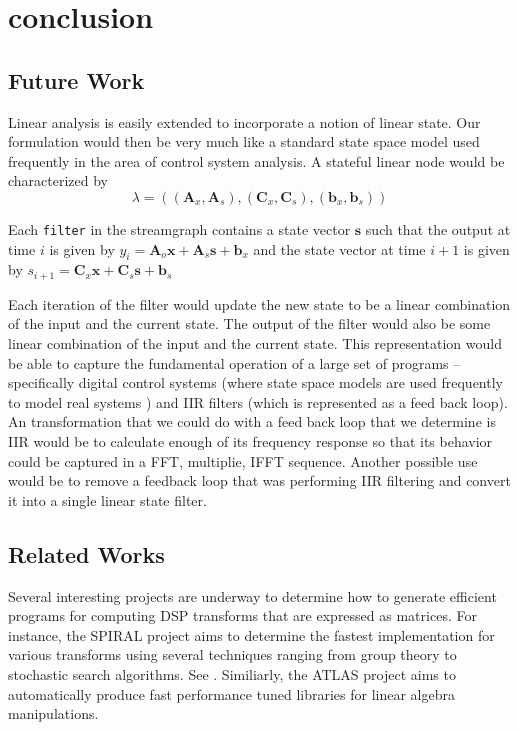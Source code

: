 \section{conclusion}




\subsection{Future Work}
Linear analysis is easily extended to incorporate a notion of linear state.
Our formulation would then be very much like a standard state space model used 
frequently in the area of control system analysis. A stateful linear node would
be characterized by
\begin{equation} \nonumber
\lambda=(({\mathbf A}_x, {\mathbf A}_s), ({\mathbf C}_x, {\mathbf C}_s), 
({\mathbf b}_x, {\mathbf b}_s))
\end{equation}

Each {\tt filter} in the streamgraph contains a state vector ${\mathbf s}$
such that the output at time $i$ is given by 
$y_i={\mathbf A}_o{\mathbf x} + {\mathbf A}_s{\mathbf s} + {\mathbf b}_x$
and the state vector at time $i+1$ is given by
$s_{i+1}={\mathbf C}_x{\mathbf x} + {\mathbf C}_s{\mathbf s} + {\mathbf b}_s$

Each iteration of the filter would update the new state to be
a linear combination of the input and the current state. The output of the 
filter would also be some linear combination of the input and the current state.
This representation would be able to capture the fundamental operation of
a large set of programs -- specifically digital control systems (where state
space models are used frequently to model real systems ) and IIR filters (which
is represented as a feed back loop). An transformation that we could do with 
a feed back loop that we determine is IIR would be to calculate enough of its
frequency response so that its behavior could be captured in a FFT, multiplie,
IFFT sequence. Another possible use would be to remove a feedback loop that was
performing IIR filtering and convert it into a single linear state filter.  




\subsection{Related Works}
Several interesting projects are underway to determine how to generate efficient programs
for computing DSP transforms that are expressed as matrices. For instance, the SPIRAL
project\cite{spiral} aims to determine the fastest implementation for various transforms
using several techniques ranging from group theory to stochastic search algorithms. See
 \cite{xiong-thesis,xiong01spl,johnson01searching,egner01automatic}.
Similiarly, the ATLAS project \cite{whaley01automated} aims to automatically produce fast
performance tuned libraries for linear algebra manipulations.

